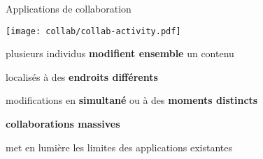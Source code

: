 



\begin{frame}{Applications de collaboration}
    \begin{minipage}[c][.55\textheight][t]{\textwidth}
        \centering
        \texttt{[image: collab/collab-activity.pdf]}
    \end{minipage}
    \begin{minipage}{\textwidth}
        \begin{compactitemize}
            \item plusieurs individus \textbf{modifient ensemble} un contenu
            \begin{compactitemize}
                \item localisés à des \textbf{endroits différents}
                \item modifications en \textbf{simultané} ou à des \textbf{moments distincts}
            \end{compactitemize}
            \item \textbf{collaborations massives}
            \begin{compactitemize}
                \item met en lumière les limites des applications existantes
            \end{compactitemize}
        \end{compactitemize}
    \end{minipage}
\end{frame}

